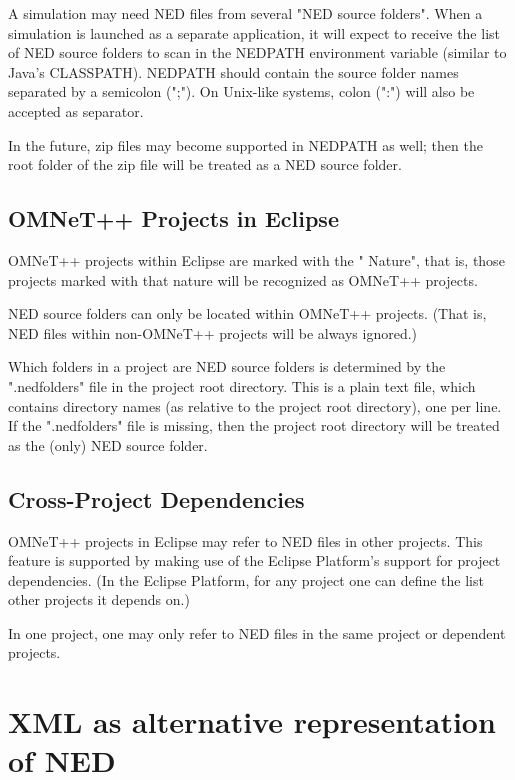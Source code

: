 A simulation may need NED files from several "NED source folders".
When a simulation is launched as a separate application, it will expect
to receive the list of NED source folders to scan in the NEDPATH
environment variable (similar to Java's CLASSPATH). NEDPATH should
contain the source folder names separated by a semicolon (";").
On Unix-like systems, colon (":") will also be accepted as separator.

In the future, zip files may become supported in NEDPATH as well;
then the root folder of the zip file will be treated as a NED source
folder.


\subsection{OMNeT++ Projects in Eclipse}

OMNeT++ projects within Eclipse are marked with the "{\opp} Nature",
that is, those projects marked with that nature will be recognized as
OMNeT++ projects.

NED source folders can only be located within OMNeT++ projects. (That is,
NED files within non-OMNeT++ projects will be always ignored.)

Which folders in a project are NED source folders is determined by
the ".nedfolders" file in the project root directory. This is a plain
text file, which contains directory names (as relative to the
project root directory), one per line. If the ".nedfolders" file is
missing, then the project root directory will be treated as the (only)
NED source folder.


\subsection{Cross-Project Dependencies}

OMNeT++ projects in Eclipse may refer to NED files in other projects.
This feature is supported by making use of the Eclipse Platform's
support for project dependencies. (In the Eclipse Platform, for any
project one can define the list other projects it depends on.)

In one project, one may only refer to NED files in the same project
or dependent projects.




\section{XML as alternative representation of NED}

